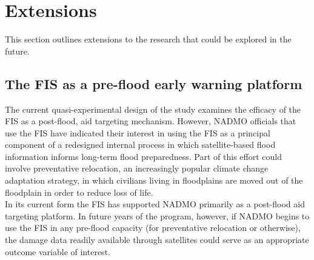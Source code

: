 \chapter{Extensions}

This section outlines extensions to the research that could be explored in the future.

\section{The FIS as a pre-flood early warning platform}

The current quasi-experimental design of the study examines the efficacy of the FIS as a post-flood, aid targeting mechanism. However, NADMO officials that use the FIS have indicated their interest in using the FIS as a principal component of a redesigned internal process in which satellite-based flood information informs long-term flood preparedness. Part of this effort could involve preventative relocation, an increasingly popular climate change adaptation strategy, in which civilians living in floodplains are moved out of the floodplain in order to reduce loss of life.\\

In its current form the FIS has supported NADMO primarily as a post-flood aid targeting platform. In future years of the program, however, if NADMO begins to use the FIS in any pre-flood capacity (for preventative relocation or otherwise), the damage data readily available through satellites could serve as an appropriate outcome variable of interest.

